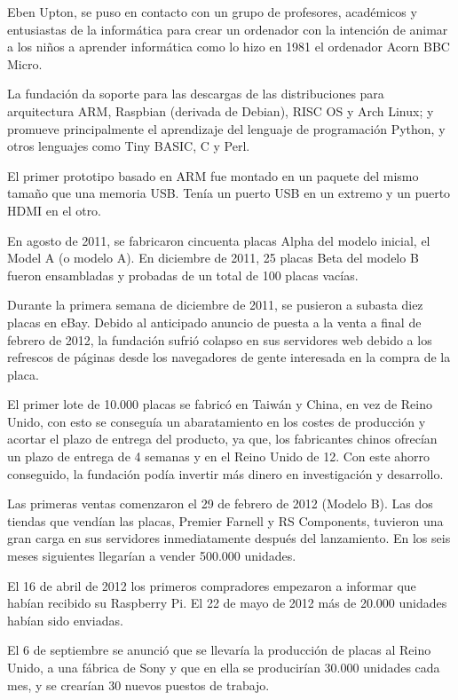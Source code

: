 \documentclass[a4paper,11pt,oneside]{book}
\begin{document}
Eben Upton, se puso en contacto con un grupo de profesores, académicos y entusiastas de la informática para crear un ordenador con la intención de animar a los niños a aprender informática como lo hizo en 1981 el ordenador Acorn BBC Micro.

La fundación da soporte para las descargas de las distribuciones para arquitectura ARM, Raspbian (derivada de Debian), RISC OS y Arch Linux; y promueve principalmente el aprendizaje del lenguaje de programación Python, y otros lenguajes como Tiny BASIC, C y Perl.

El primer prototipo basado en ARM fue montado en un paquete del mismo tamaño que una memoria USB. Tenía un puerto USB en un extremo y un puerto HDMI en el otro.

En agosto de 2011, se fabricaron cincuenta placas Alpha del modelo inicial, el Model A (o modelo A). En diciembre de 2011, 25 placas Beta del modelo B fueron ensambladas y probadas de un total de 100 placas vacías.

Durante la primera semana de diciembre de 2011, se pusieron a subasta diez placas en eBay. Debido al anticipado anuncio de puesta a la venta a final de febrero de 2012, la fundación sufrió colapso en sus servidores web debido a los refrescos de páginas desde los navegadores de gente interesada en la compra de la placa.

El primer lote de 10.000 placas se fabricó en Taiwán y China, en vez de Reino Unido, con esto se conseguía un abaratamiento en los costes de producción y acortar el plazo de entrega del producto, ya que, los fabricantes chinos ofrecían un plazo de entrega de 4 semanas y en el Reino Unido de 12. Con este ahorro conseguido, la fundación podía invertir más dinero en investigación y desarrollo.

Las primeras ventas comenzaron el 29 de febrero de 2012 (Modelo B). Las dos tiendas que vendían las placas, Premier Farnell y RS Components, tuvieron una gran carga en sus servidores inmediatamente después del lanzamiento. En los seis meses siguientes llegarían a vender  500.000 unidades.

El 16 de abril de 2012 los primeros compradores empezaron a informar que habían recibido su Raspberry Pi. El 22 de mayo de 2012 más de 20.000 unidades habían sido enviadas.

El 6 de septiembre se anunció que se llevaría la producción de placas al Reino Unido, a una fábrica de Sony y que en ella se producirían 30.000 unidades cada mes, y se crearían 30 nuevos puestos de trabajo.
\end{document}
